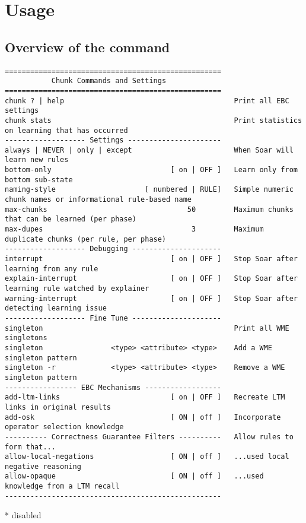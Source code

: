 \section{Usage}
\label{CHUNKING-usage}

\subsection{Overview of the  command}

{\scriptsize
\begin{verbatim}
===================================================
           Chunk Commands and Settings
===================================================
chunk ? | help                                        Print all EBC settings
chunk stats                                           Print statistics on learning that has occurred
------------------- Settings ----------------------
always | NEVER | only | except                        When Soar will learn new rules
bottom-only                            [ on | OFF ]   Learn only from bottom sub-state
naming-style                     [ numbered | RULE]   Simple numeric chunk names or informational rule-based name
max-chunks                                 50         Maximum chunks that can be learned (per phase)
max-dupes                                   3         Maximum duplicate chunks (per rule, per phase)
------------------- Debugging ---------------------
interrupt                              [ on | OFF ]   Stop Soar after learning from any rule
explain-interrupt                      [ on | OFF ]   Stop Soar after learning rule watched by explainer
warning-interrupt                      [ on | OFF ]   Stop Soar after detecting learning issue
------------------- Fine Tune ---------------------
singleton                                             Print all WME singletons
singleton                <type> <attribute> <type>    Add a WME singleton pattern
singleton -r             <type> <attribute> <type>    Remove a WME singleton pattern
----------------- EBC Mechanisms ------------------
add-ltm-links                          [ on | OFF ]   Recreate LTM links in original results
add-osk                                [ ON | off ]   Incorporate operator selection knowledge
---------- Correctness Guarantee Filters ----------   Allow rules to form that...
allow-local-negations                  [ ON | off ]   ...used local negative reasoning
allow-opaque                           [ ON | off ]   ...used knowledge from a LTM recall
---------------------------------------------------
\end{verbatim}
* disabled
}

